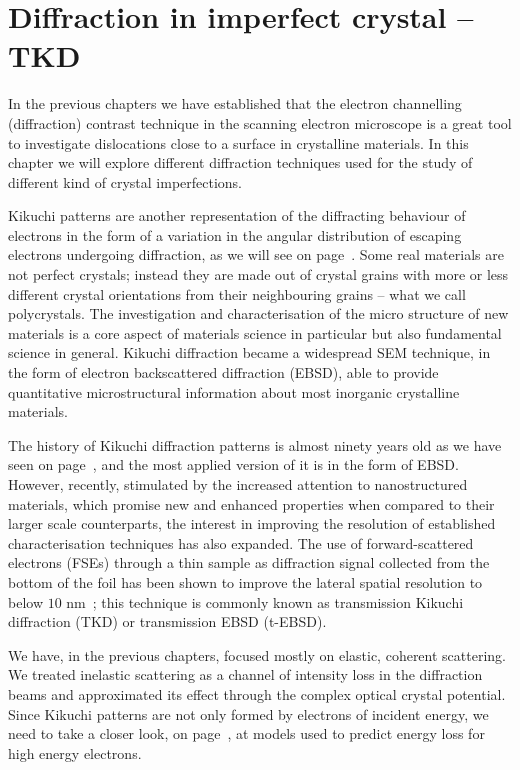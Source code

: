\chapter{Diffraction in imperfect crystal -- TKD}
\label{chap:TKD}
In the previous chapters we have established that the electron channelling (diffraction) contrast  technique in the scanning electron microscope is a great tool to investigate dislocations close to a surface in crystalline materials. In this chapter we will explore different diffraction techniques used for the study of different kind of crystal imperfections. 

Kikuchi patterns are another representation of the diffracting behaviour of electrons in the form of a variation in the angular distribution of escaping electrons undergoing diffraction, as we will see on page~\pageref{sec:Kikuchi}. Some real materials are not perfect crystals; instead they are made out of crystal grains with more or less different crystal orientations from their neighbouring grains -- what we call polycrystals. The investigation and characterisation of the micro structure of new materials is a core aspect of materials science in particular but also fundamental science in general. Kikuchi diffraction became a widespread SEM technique, in the form of electron backscattered diffraction (EBSD), able to provide quantitative microstructural information about most inorganic crystalline materials. 



The history of Kikuchi diffraction patterns is almost ninety years old as we have seen on page~\pageref{table:historyDiff}, and the most applied version of it is in the form of EBSD.
However, recently, stimulated by the increased attention to nanostructured materials, which promise new and enhanced properties when compared to their larger scale counterparts, the interest in improving the resolution of established characterisation techniques has also expanded. The use of forward-scattered electrons (FSEs) through a thin sample as diffraction signal collected from the bottom of the foil has been shown to improve the lateral spatial resolution to below $10$ nm~\cite{Keller12, Trimby12}; this technique is commonly known as transmission Kikuchi diffraction (TKD) or transmission EBSD (t-EBSD). 

We have, in the previous chapters, focused mostly on elastic, coherent scattering. We treated inelastic scattering as a channel of intensity loss in the diffraction beams and approximated its effect through the complex optical crystal potential. Since Kikuchi patterns are not only formed by electrons of incident energy, we need to take a closer look, on page~\pageref{sec:scatter}, at models used to predict energy loss for high energy electrons.


